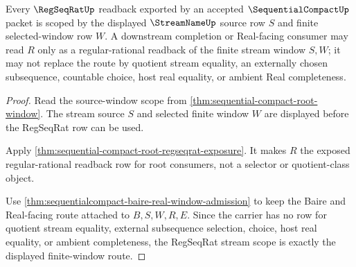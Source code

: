 \begin{theorem}
\label{thm:sequentialcompact-regseqrat-stream-scope}
Every $\RegSeqRatUp$ readback exported by an accepted $\SequentialCompactUp$ packet is scoped by the displayed $\StreamNameUp$ source row $S$ and finite selected-window row $W$. A downstream completion or Real-facing consumer may read $R$ only as a regular-rational readback of the finite stream window $S,W$; it may not replace the route by quotient stream equality, an externally chosen subsequence, countable choice, host real equality, or ambient Real completeness.
\end{theorem}
\begin{proof}
Read the source-window scope from \autoref{thm:sequential-compact-root-window}. The stream source $S$ and selected finite window $W$ are displayed before the RegSeqRat row can be used.

Apply \autoref{thm:sequential-compact-root-regseqrat-exposure}. It makes $R$ the exposed regular-rational readback row for root consumers, not a selector or quotient-class object.

Use \autoref{thm:sequentialcompact-baire-real-window-admission} to keep the Baire and Real-facing route attached to $B,S,W,R,E$. Since the carrier has no row for quotient stream equality, external subsequence selection, choice, host real equality, or ambient completeness, the RegSeqRat stream scope is exactly the displayed finite-window route.
\end{proof}

